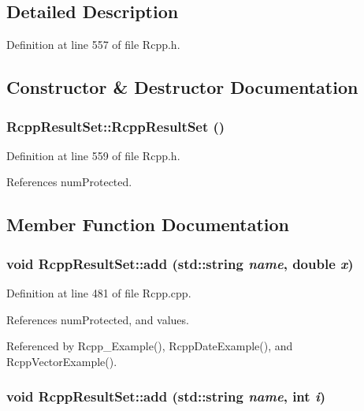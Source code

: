 \subsection{Detailed Description}


Definition at line 557 of file Rcpp.h.

\subsection{Constructor \& Destructor Documentation}
\hypertarget{classRcppResultSet_b799c6b9bd730e55d92228203903ba74}{
\subsubsection[RcppResultSet]{\setlength{\rightskip}{0pt plus 5cm}RcppResultSet::RcppResultSet ()}}
\label{classRcppResultSet_b799c6b9bd730e55d92228203903ba74}




Definition at line 559 of file Rcpp.h.

References numProtected.

\subsection{Member Function Documentation}
\hypertarget{classRcppResultSet_7c7da37f18bd352303bf06b7c5233bc4}{
\subsubsection[add]{\setlength{\rightskip}{0pt plus 5cm}void RcppResultSet::add (std::string {\em name}, \/  double {\em x})}}
\label{classRcppResultSet_7c7da37f18bd352303bf06b7c5233bc4}




Definition at line 481 of file Rcpp.cpp.

References numProtected, and values.

Referenced by Rcpp\_\-Example(), RcppDateExample(), and RcppVectorExample().\hypertarget{classRcppResultSet_8b7841ff8a52477b0c6a1fb7c03c0fd9}{
\subsubsection[add]{\setlength{\rightskip}{0pt plus 5cm}void RcppResultSet::add (std::string {\em name}, \/  int {\em i})}}
\label{classRcppResultSet_8b7841ff8a52477b0c6a1fb7c03c0fd9}




